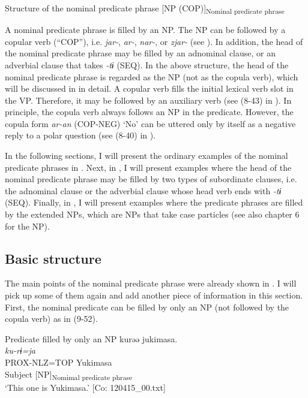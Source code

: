 \ea   Structure of the nominal predicate phrase \label{ex:9.51}
  [NP \hspace{\tabcolsep} (COP)]\textsubscript{Nominal predicate phrase}
\z

A nominal predicate phrase is filled by an NP. The NP can be followed by a copular verb (“COP”), i.e. \textit{jar-}, \textit{ar-}, \textit{nar-}, or \textit{zjar-} (see ). In addition, the head of the nominal predicate phrase may be filled by an adnominal clause, or an adverbial clause that takes \textit{{}-tɨ} (SEQ). In the above structure, the head of the nominal predicate phrase is regarded as the NP (not as the copula verb), which will be discussed in  in detail. A copular verb fills the initial lexical verb slot in the VP. Therefore, it may be followed by an auxiliary verb (see (8-43) in ). In principle, the copula verb always follows an NP in the predicate. However, the copula form \textit{ar-an} (COP-NEG) ‘No’ can be uttered only by itself as a negative reply to a polar question (see (8-40) in ).

In the following sections, I will present the ordinary examples of the nominal predicate phrases in . Next, in , I will present examples where the head of the nominal predicate phrase may be filled by two types of subordinate clauses, i.e. the adnominal clause or the adverbial clause whose head verb ends with \textit{{}-tɨ} (SEQ). Finally, in , I will present examples where the predicate phrases are filled by the extended NPs, which are NPs that take case particles (see also chapter 6 for the NP).

\subsection{Basic structure}\label{sec:9.3.1}

The main points of the nominal predicate phrase were already shown in . I will pick up some of them again and add another piece of information in this section. First, the nominal predicate can be filled by only an NP (not followed by the copula verb) as in (9-52).

\ea   Predicate filled by only an NP \label{ex:9.52}
 \gllll  kurəə  jukimasa.\\
    \textit{ku-rɨ=ja}  \textit{}\\
    PROX-NLZ=TOP  Yukimasa\\
    Subject  [NP]\textsubscript{Nomimal predicate phrase}\\
    \glt     ‘This one is Yukimasa.’ [Co: 120415\_00.txt]
\z

